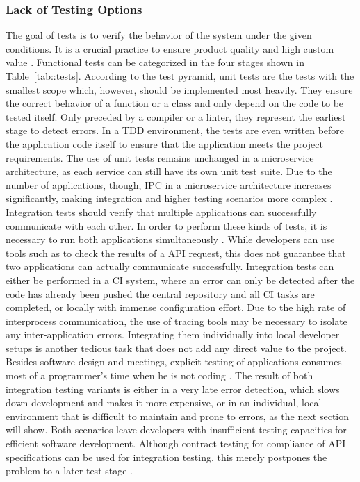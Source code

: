         \subsubsection{Lack of Testing Options}\label{sss::testing_problem}
        The goal of tests is to verify the behavior of the system under the given conditions. It is a crucial practice to ensure product quality and high custom value \cite{azuredevops}. Functional tests can be categorized in the four stages shown in Table~\ref{tab::tests}. According to the test pyramid, unit tests are the tests with the smallest scope which, however, should be implemented most heavily. They ensure the correct behavior of a function or a class and only depend on the code to be tested itself. Only preceded by a compiler or a linter, they represent the earliest stage to detect errors. In a \ac{TDD} environment, the tests are even written before the application code itself to ensure that the application meets the project requirements. The use of unit tests remains unchanged in a microservice architecture, as each service can still have its own unit test suite. Due to the number of applications, though, \ac{IPC} in a microservice architecture increases significantly, making integration and higher testing scenarios more complex \cite{microtest}. \newline
        Integration tests should verify that multiple applications can successfully communicate with each other. In order to perform these kinds of tests, it is necessary to run both applications simultaneously \cite{azuredevops}. While developers can use tools such as  to check the results of a \ac{API} request, this does not guarantee that two applications can actually communicate successfully. Integration tests can either be performed in a \ac{CI} system, where an error can only be detected after the code has already been pushed the central repository and all \ac{CI} tasks are completed, or locally with immense configuration effort. Due to the high rate of interprocess communication, the use of tracing tools may be necessary to isolate any inter-application errors. Integrating them individually into local developer setups is another tedious task that does not add any direct value to the project. Besides software design and meetings, explicit testing of applications consumes most of a programmer's time when he is not coding \cite{setuppain}.\newline
        The result of both integration testing variants is either in a very late error detection, which slows down development and makes it more expensive, or in an individual, local environment that is difficult to maintain and prone to errors, as the next section will show. Both scenarios leave developers with insufficient testing capacities for efficient software development. Although contract testing for compliance of \ac{API} specifications can be used for integration testing, this merely postpones the problem to a later test stage \cite{microtest}.\newline
